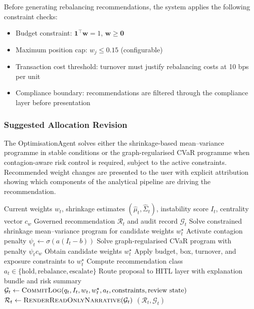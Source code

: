 \documentclass[11pt]{article}
\begin{document}
Before generating rebalancing recommendations, the system applies the following constraint checks:
\begin{itemize}
  \item Budget constraint: $\mathbf{1}^\top \mathbf{w} = 1$, $\mathbf{w} \geq \mathbf{0}$
  \item Maximum position cap: $w_j \leq 0.15$ (configurable)
  \item Transaction cost threshold: turnover must justify rebalancing costs at 10 bps per unit
  \item Compliance boundary: recommendations are filtered through the compliance layer before presentation
\end{itemize}

\subsubsection{Suggested Allocation Revision}

The OptimisationAgent solves either the shrinkage-based mean--variance programme in stable conditions or the graph-regularised CVaR programme when contagion-aware risk control is required, subject to the active constraints. Recommended weight changes are presented to the user with explicit attribution showing which components of the analytical pipeline are driving the recommendation.

\begin{algorithm}[htbp]
\caption{Governed Rebalancing and Response Assembly}
\label{alg:governed-rebalancing}
\begin{algorithmic}[1]
\Require Current weights $w_t$, shrinkage estimates $(\hat{\mu}_t, \hat{\Sigma}_t)$, instability score $I_t$, centrality vector $c_w$
\Ensure Governed recommendation $\mathcal{R}_t$ and audit record $\mathcal{G}_t$
    \State Solve constrained shrinkage mean--variance program for candidate weights $w_t^\star$
\Else
    \State Activate contagion penalty $\psi_t \leftarrow \sigma(a(I_t-b))$
    \State Solve graph-regularised CVaR program with penalty $\psi_t c_w$
    \State Obtain candidate weights $w_t^\star$
\EndIf
\State Apply budget, box, turnover, and exposure constraints to $w_t^\star$
\State Compute recommendation class $a_t \in \{\text{hold},\text{rebalance},\text{escalate}\}$
    \State Route proposal to HITL layer with explanation bundle and risk summary
\EndIf
\State $\mathcal{G}_t \leftarrow \textsc{CommitLog}(q_t, I_t, w_t, w_t^\star, a_t, \text{constraints}, \text{review state})$
\State $\mathcal{R}_t \leftarrow \textsc{RenderReadOnlyNarrative}(\mathcal{G}_t)$
\State \Return $(\mathcal{R}_t, \mathcal{G}_t)$
\end{algorithmic}
\end{algorithm}
\end{document}
